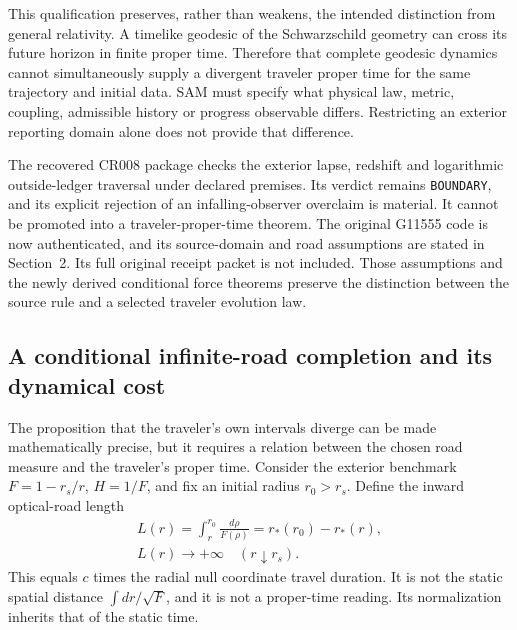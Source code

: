 \documentclass[10pt,twocolumn,letterpaper]{article}
\begin{document}
This qualification preserves, rather than weakens, the intended distinction from general relativity. A timelike geodesic of the Schwarzschild geometry can cross its future horizon in finite proper time. Therefore that complete geodesic dynamics cannot simultaneously supply a divergent traveler proper time for the same trajectory and initial data. SAM must specify what physical law, metric, coupling, admissible history or progress observable differs. Restricting an exterior reporting domain alone does not provide that difference.

The recovered CR008 package checks the exterior lapse, redshift and logarithmic outside-ledger traversal under declared premises. Its verdict remains \texttt{BOUNDARY}, and its explicit rejection of an infalling-observer overclaim is material. It cannot be promoted into a traveler-proper-time theorem. The original G11555 code is now authenticated, and its source-domain and road assumptions are stated in Section~2. Its full original receipt packet is not included. Those assumptions and the newly derived conditional force theorems preserve the distinction between the source rule and a selected traveler evolution law.



\subsection{A conditional infinite-road completion and its dynamical cost}
\label{sec:ch5-conditional-road}
The proposition that the traveler's own intervals diverge can be made
mathematically precise, but it requires a relation between the chosen road
measure and the traveler's proper time. Consider the exterior benchmark
$F=1-r_s/r$, $H=1/F$, and fix an initial radius $r_0>r_s$. Define the inward
optical-road length
\begin{equation}
 \begin{gathered}
 L(r)=\int_r^{r_0}\frac{d\rho}{F(\rho)}=r_*(r_0)-r_*(r),\\
 L(r)\longrightarrow+\infty\quad(r\downarrow r_s).
 \end{gathered}
 \label{eq:ch5-optical-road}
\end{equation}
This equals $c$ times the radial null coordinate travel duration. It is
not the static spatial distance $\int dr/\sqrt F$, and it is not a
proper-time reading. Its normalization inherits that of the static time.
\end{document}
